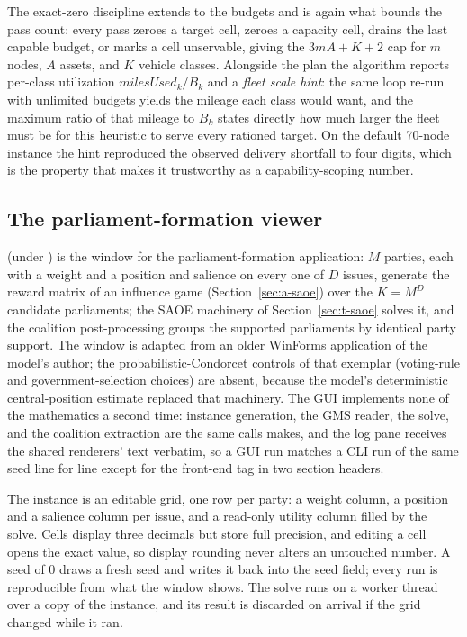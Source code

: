 The exact-zero discipline extends to the budgets and is again what bounds
the pass count: every pass zeroes a target cell, zeroes a capacity cell,
drains the last capable budget, or marks a cell unservable, giving the
$3mA + K + 2$ cap for $m$ nodes, $A$ assets, and $K$ vehicle classes.
Alongside the plan the algorithm reports per-class utilization
$\mathit{milesUsed}_k / B_k$ and a \emph{fleet scale hint}: the same loop
re-run with unlimited budgets yields the mileage each class would want,
and the maximum ratio of that mileage to $B_k$ states directly how much
larger the fleet must be for this heuristic to serve every rationed
target. On the default 70-node instance the hint reproduced the observed
delivery shortfall to four digits, which is the property that makes it
trustworthy as a capability-scoping number.

\subsection{The parliament-formation viewer}
\label{sec:t-pformgui}

 (under ) is the window for the
parliament-formation application: $M$ parties, each with a weight and a
position and salience on every one of $D$ issues, generate the reward
matrix of an influence game (Section~\ref{sec:a-saoe}) over the $K = M^D$
candidate parliaments; the SAOE machinery of
Section~\ref{sec:t-saoe} solves it, and the coalition post-processing
groups the supported parliaments by identical party support. The window
is adapted from an older WinForms application of the model's author; the
probabilistic-Condorcet controls of that exemplar (voting-rule and
government-selection choices) are absent, because the model's
deterministic central-position estimate replaced that machinery. The GUI
implements none of the mathematics a second time: instance generation,
the GMS reader, the solve, and the coalition extraction are the same
 calls  makes, and the log pane receives
the shared renderers' text verbatim, so a GUI run matches a CLI run of
the same seed line for line except for the front-end tag in two section
headers.

The instance is an editable grid, one row per party: a weight column, a
position and a salience column per issue, and a read-only utility column
filled by the solve. Cells display three decimals but store full
precision, and editing a cell opens the exact value, so display rounding
never alters an untouched number. A seed of 0 draws a fresh seed and
writes it back into the seed field; every run is reproducible from what
the window shows. The solve runs on a worker thread over a copy of the
instance, and its result is discarded on arrival if the grid changed
while it ran.

